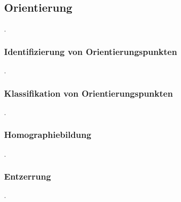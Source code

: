 \subsection{Orientierung}
\label{sec:orientierung}

.

\subsubsection{Identifizierung von Orientierungspunkten}
\label{sec:orientierungspunkte_finden}

.

\subsubsection{Klassifikation von Orientierungspunkten}
\label{sec:orientierungspunkte_klassifizieren}

.

\subsubsection{Homographiebildung}
\label{sec:homographie}

.

\subsubsection{Entzerrung}
\label{sec:entzerrung}

.
